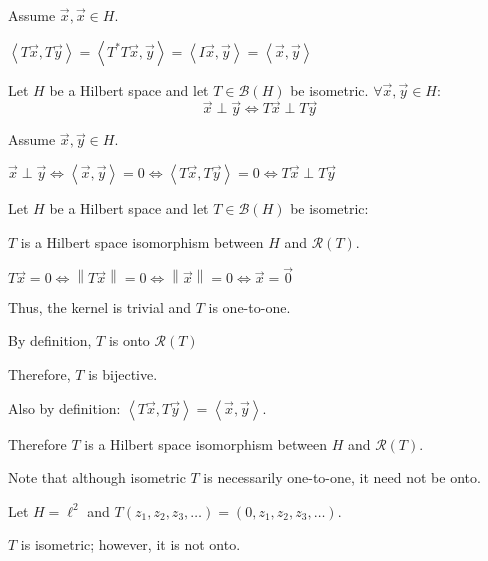 \documentclass[letterpaper,12pt,fleqn]{article}
\newcommand{\mb}{\mathcal{B}}
\newcommand{\mr}{\mathcal{R}}
\newcommand{\vx}{\vec{x}}
\newcommand{\vy}{\vec{y}}
\newcommand{\vo}{\vec{0}}
\newcommand{\norm}[1]{\left\|#1\right\|}
\newcommand{\inner}[1]{\left<#1\right>}
\begin{document}
\begin{theproof}
  Assume $\vx,\vx\in H$.
  
  $\inner{T\vx,T\vy}=\inner{T^*T\vx,\vy}=\inner{I\vx,\vy}=\inner{\vx,\vy}$
\end{theproof}

\begin{corollary}
  Let $H$ be a Hilbert space and let $T\in\mb(H)$ be isometric.
  $\forall\vx,\vy\in H$:
  \[\vx\perp\vy\iff T\vx\perp T\vy\]
\end{corollary}

\begin{theproof}
  Assume $\vx,\vy\in H$.

  $\vx\perp\vy\iff\inner{\vx,\vy}=0\iff\inner{T\vx,T\vy}=0\iff
  T\vx\perp T\vy$
\end{theproof}

\begin{theorem}
  Let $H$ be a Hilbert space and let $T\in\mb(H)$ be isometric:

  \qquad$T$ is a Hilbert space isomorphism between $H$ and $\mr(T)$.
\end{theorem}

\begin{theproof}
  $ T\vx=0\iff\norm{T\vx}=0\iff\norm{\vx}=0\iff\vx=\vo$

  Thus, the kernel is trivial and $T$ is one-to-one.

  By definition, $T$ is onto $\mr(T)$

  Therefore, $T$ is bijective.

  Also by definition: $\inner{T\vx,T\vy}=\inner{\vx,\vy}$.

  Therefore $T$ is a Hilbert space isomorphism between $H$ and $\mr(T)$.
\end{theproof}

Note that although isometric $T$ is necessarily one-to-one, it need not
be onto.

\begin{example}
  Let $H=\ell^2$ and $T(z_1,z_2,z_3,\ldots)=(0,z_1,z_2,z_3,\ldots)$.

  $T$ is isometric; however, it is not onto.
\end{example}
\end{document}
